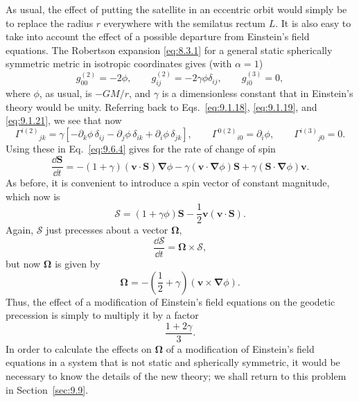 As usual, the effect of putting the satellite in an eccentric orbit would
simply be to replace the radius \(r\) everywhere with the semilatus rectum
\(L\). It is also easy to take into account the effect of a possible
departure from Einstein's field equations. The Robertson expansion
\eqref{eq:8.3.1} for a general static spherically symmetric metric in
isotropic coordinates gives (with \(\alpha=1\))
\[
  g_{00}^{(2)}=-2\phi,
  \qquad
  g_{ij}^{(2)}=-2\gamma\phi\delta_{ij},
  \qquad
  g_{i0}^{(3)}=0,
\]
where \(\phi\), as usual, is \(-GM/r\), and \(\gamma\) is a dimensionless
constant that in Einstein's theory would be unity. Referring back to
Eqs.~\eqref{eq:9.1.18}, \eqref{eq:9.1.19}, and \eqref{eq:9.1.21}, we see
that now
\[
  \Gamma^{i(2)}{}_{jk}
  =
  \gamma\left[
    -\partial_k\phi\,\delta_{ij}
    -\partial_j\phi\,\delta_{ik}
    +\partial_i\phi\,\delta_{jk}
  \right],
  \qquad
  \Gamma^{0(2)}{}_{i0}=\partial_i\phi,
  \qquad
  \Gamma^{i(3)}{}_{j0}=0.
\]
Using these in Eq.~\eqref{eq:9.6.4} gives for the rate of change of spin
\[
  \frac{\dd\mathbf S}{\dd t}
  =
  -(1+\gamma)(\mathbf v\cdot\mathbf S)\boldsymbol\nabla\phi
  -\gamma(\mathbf v\cdot\boldsymbol\nabla\phi)\mathbf S
  +\gamma(\mathbf S\cdot\boldsymbol\nabla\phi)\mathbf v.
\]
As before, it is convenient to introduce a spin vector of constant
magnitude, which now is
\[
  \boldsymbol{\mathcal S}
  =
  (1+\gamma\phi)\mathbf S
  -\frac12\mathbf v(\mathbf v\cdot\mathbf S).
\]
Again, \(\boldsymbol{\mathcal S}\) just precesses about a vector
\(\boldsymbol\Omega\),
\[
  \frac{\dd\boldsymbol{\mathcal S}}{\dd t}
  =
  \boldsymbol\Omega\times\boldsymbol{\mathcal S},
\]
but now \(\boldsymbol\Omega\) is given by
\begin{equation}
  \boldsymbol\Omega
  =
  -\left(\frac12+\gamma\right)
  (\mathbf v\times\boldsymbol\nabla\phi).
  \tag{9.6.24}\label{eq:9.6.24}
\end{equation}
Thus, the effect of a modification of Einstein's field equations on the
geodetic precession is simply to multiply it by a factor
\[
  \frac{1+2\gamma}{3}.
\]
In order to calculate the effects on \(\boldsymbol\Omega\) of a
modification of Einstein's field equations in a system that is not static
and spherically symmetric, it would be necessary to know the details of
the new theory; we shall return to this problem in Section~\ref{sec:9.9}.
